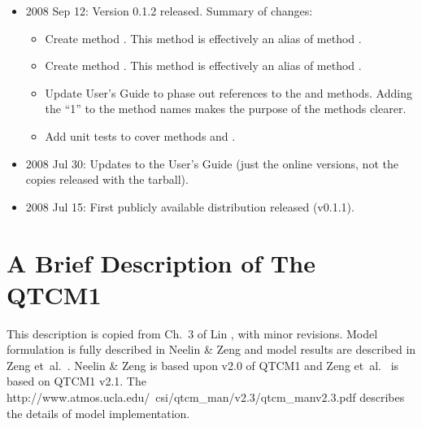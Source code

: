 \begin{itemize}
\item 2008 Sep 12:  Version 0.1.2 released.  Summary of changes:
	\begin{itemize}
	\item Create  method .
		This method is effectively an alias of method 
		.
	\item Create  method .
		This method is effectively an alias of method 
		.
	\item Update User's Guide to phase out references to
		the 
		and  methods.  
		Adding the ``1'' to the method names makes the purpose
		of the methods clearer.
	\item Add unit tests to cover methods  and
		.
	\end{itemize}

\item 2008 Jul 30:  Updates to the User's Guide (just the online versions,
        not the copies released with the tarball).

\item 2008 Jul 15:  First publicly available distribution 
	released (v0.1.1).
\end{itemize}




\section{A Brief Description of The QTCM1}   \label{sec:brief_qtcm}

This description is copied from Ch.\ 3 of Lin \cite{Lin:2000}, 
with minor revisions.
Model formulation is fully described in
Neelin \& Zeng \cite{Neelin/Zeng:2000} and model
results are described in Zeng et~al.\ \cite{Zeng/etal:2000}.
Neelin \& Zeng \cite{Neelin/Zeng:2000} is based upon v2.0 of QTCM1
and Zeng et~al.\ \cite{Zeng/etal:2000} is based on QTCM1 v2.1.
The 
%
{%
	{http://www.atmos.ucla.edu/~csi/qtcm_man/v2.3/qtcm_manv2.3.pdf}}
\cite{Neelin/etal:2002}
describes the details of model implementation.

